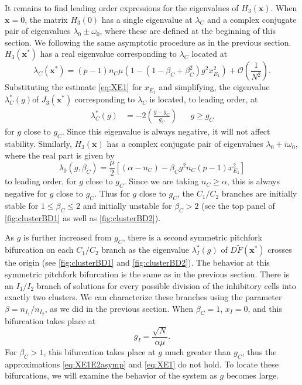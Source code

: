 \documentclass[reqno]{siamonline190516}
\newcommand{\xvec}{\mathbf{x}}
\begin{document}
It remains to find leading order expressions for the eigenvalues of $H_3(\xvec)$. When $\xvec = 0$, the matrix $H_3(0)$ has a single eigenvalue at $\lambda_C$ and a complex conjugate pair of eigenvalues $\lambda_0 \pm \omega_0$, where these are defined at the beginning of this section. We following the same asymptotic procedure as in the previous section. $H_3(\xvec^*)$ has a real eigenvalue corresponding to $\lambda_C$ located at
\[
\lambda_C(\xvec^*) = (p-1)n_C \mu  \left(1 - (1 - \beta_C+\beta_C^2)g^2 x_{E_1}^2 \right) + \mathcal{O}\left(\frac{1}{N^2} \right).
\]
Substituting the estimate \cref{eq:XE1} for $x_{E_1}$ and simplifying, the eigenvalue $\lambda_C^*(g) $of $J_3(\xvec^*)$ corresponding to $\lambda_C$ is located, to leading order, at 
\begin{align*}
    \lambda_C^*(g) &= -2\left( \frac{g - g_C}{g_C} \right)  && g \geq g_C
\end{align*}
for $g$ close to $g_C$. Since this eigenvalue is always negative, it will not affect stability. Similarly, $H_3(\xvec)$ has a complex conjugate pair of eigenvalues $\lambda_0 + i \omega_0$, where the real part is given by
\begin{equation*}
\lambda_0(g, \beta_C) = \frac{\mu}{2}\left[ (\alpha - n_C) - \beta_C g^2 n_C (p - 1) x_{E_1}^2 \right]
\end{equation*}
to leading order, for $g$ close to $g_C$. Since we are taking $n_C \geq \alpha$, this is always negative for $g$ close to $g_C$. Thus for $g$ close to $g_C$, the $C_1/C_2$ branches are initially stable for $1 \leq \beta_C \leq 2$ and initially unstable for $\beta_C > 2$ (see the top panel of \cref{fig:clusterBD1} as well as \cref{fig:clusterBD2}).

As $g$ is further increased from $g_C$, there is a second symmetric pitchfork bifurcation on each $C_1/C_2$ branch as the eigenvalue $\lambda_I^*(g)$ of $D\tilde{F}(\xvec^*)$ crosses the origin (see \cref{fig:clusterBD1} and \cref{fig:clusterBD2}). The behavior at this symmetric pitchfork bifurcation is the same as in the previous section. There is an $I_1/I_2$ branch of solutions for every possible division of the inhibitory cells into exactly two clusters. We can characterize these branches using the parameter $\beta = n_{I_1}/n_{I_2}$, as we did in the previous section. When $\beta_C = 1$, $x_I = 0$, and this bifurcation takes place at 
\begin{equation}\label{eq:gpitchinhbeta1}
g_I = \frac{\sqrt{N}}{\alpha \mu}.
\end{equation}
For $\beta_C > 1$, this bifurcation takes place at $g$ much greater than $g_C$, thus the approximations \cref{eq:XE1E2asymp} and \cref{eq:XE1} do not hold. To locate these bifurcations, we will examine the behavior of the system as $g$ becomes large.
\end{document}
